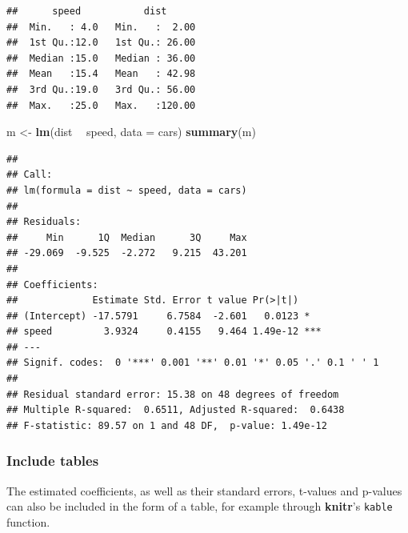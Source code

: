 \documentclass[]{book}
\newenvironment{Shaded}{\begin{snugshade}}{\end{snugshade}}
\newcommand{\DataTypeTok}[1]{\textcolor[rgb]{0.13,0.29,0.53}{#1}}
\newcommand{\DecValTok}[1]{\textcolor[rgb]{0.00,0.00,0.81}{#1}}
\newcommand{\KeywordTok}[1]{\textcolor[rgb]{0.13,0.29,0.53}{\textbf{#1}}}
\newcommand{\NormalTok}[1]{#1}
\newcommand{\OperatorTok}[1]{\textcolor[rgb]{0.81,0.36,0.00}{\textbf{#1}}}
\newcommand{\StringTok}[1]{\textcolor[rgb]{0.31,0.60,0.02}{#1}}
\begin{document}
\begin{verbatim}
##      speed           dist       
##  Min.   : 4.0   Min.   :  2.00  
##  1st Qu.:12.0   1st Qu.: 26.00  
##  Median :15.0   Median : 36.00  
##  Mean   :15.4   Mean   : 42.98  
##  3rd Qu.:19.0   3rd Qu.: 56.00  
##  Max.   :25.0   Max.   :120.00
\end{verbatim}

\begin{Shaded}
\begin{Highlighting}[]
\NormalTok{m <-}\StringTok{ }\KeywordTok{lm}\NormalTok{(dist }\OperatorTok{~}\StringTok{ }\NormalTok{speed, }\DataTypeTok{data =}\NormalTok{ cars)}
\KeywordTok{summary}\NormalTok{(m)}
\end{Highlighting}
\end{Shaded}

\begin{verbatim}
## 
## Call:
## lm(formula = dist ~ speed, data = cars)
## 
## Residuals:
##     Min      1Q  Median      3Q     Max 
## -29.069  -9.525  -2.272   9.215  43.201 
## 
## Coefficients:
##             Estimate Std. Error t value Pr(>|t|)    
## (Intercept) -17.5791     6.7584  -2.601   0.0123 *  
## speed         3.9324     0.4155   9.464 1.49e-12 ***
## ---
## Signif. codes:  0 '***' 0.001 '**' 0.01 '*' 0.05 '.' 0.1 ' ' 1
## 
## Residual standard error: 15.38 on 48 degrees of freedom
## Multiple R-squared:  0.6511,	Adjusted R-squared:  0.6438 
## F-statistic: 89.57 on 1 and 48 DF,  p-value: 1.49e-12
\end{verbatim}

\hypertarget{include-tables}{%
\subsubsection{Include tables}\label{include-tables}}

The estimated coefficients, as well as their standard errors, t-values and p-values can also be included in the form of a table, for example through \textbf{knitr}'s \texttt{kable} function.

\begin{Shaded}
\end{Shaded}
\end{document}
